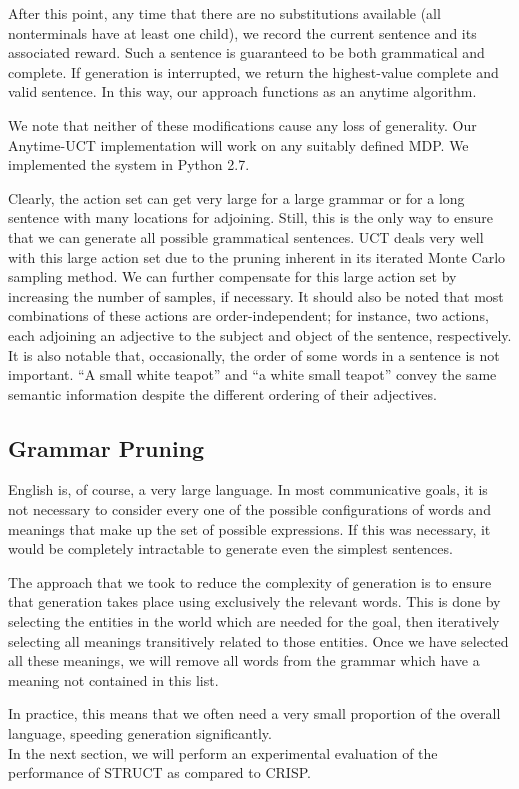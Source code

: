 After this point, any time that there are no substitutions
available (all nonterminals have at least one child), we record the
current sentence and its associated reward.  Such a sentence is
guaranteed to be both grammatical and complete.  If generation is
interrupted, we return the highest-value complete and valid sentence.
In this way, our approach functions as an anytime algorithm.

We note that neither of these modifications cause any loss of
generality.  Our Anytime-UCT implementation will work on any suitably
defined MDP.  We implemented the system in Python 2.7.

 Clearly, the action set can get very large for a large grammar or for
 a long sentence with many locations for adjoining.  Still, this is the
 only way to ensure that we can generate all possible grammatical
 sentences.  UCT deals very well with this large action set due to the
 pruning inherent in its iterated Monte Carlo sampling method.  We can
 further compensate for this large action set by increasing the number
 of samples, if necessary.  It should also be noted that most
 combinations of these actions are order-independent; for instance, two
 actions, each adjoining an adjective to the subject and object of the
 sentence, respectively.  It is also notable that, occasionally, the
 order of some words in a sentence is not important.  ``A small white
 teapot'' and ``a white small teapot'' convey the same semantic
 information despite the different ordering of their adjectives.

\subsection{Grammar Pruning}

English is, of course, a very large language.  In most communicative goals, it is
not necessary to consider every one of the possible configurations of words and
meanings that make up the set of possible expressions.  If this was necessary,
it would be completely intractable to generate even the simplest sentences.

The approach that we took to reduce the complexity of generation is to ensure that
generation takes place using exclusively the relevant words.  This is done by selecting
the entities in the world which are needed for the goal, then iteratively selecting all
meanings transitively related to those entities.  Once we have selected all these meanings,
we will remove all words from the grammar which have a meaning not contained in this list.

In practice, this means that we often need a very small proportion of the overall language,
speeding generation significantly.\\

In the next section, we will perform an experimental evaluation of the
performance of STRUCT as compared to CRISP.
